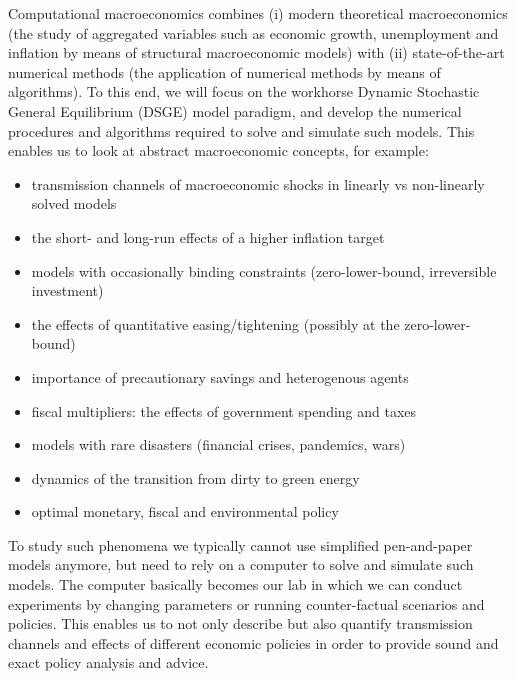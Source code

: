 Computational macroeconomics combines (i) modern theoretical macroeconomics
  (the study of aggregated variables such as economic growth, unemployment and inflation
  by means of structural macroeconomic models)
  with (ii) state-of-the-art numerical methods (the application of numerical methods by means of algorithms).
To this end, we will focus on the workhorse Dynamic Stochastic General Equilibrium (DSGE) model paradigm,
  and develop the numerical procedures and algorithms required to solve and simulate such models.
This enables us to look at abstract macroeconomic concepts, for example:
\begin{itemize}
	\item transmission channels of macroeconomic shocks in linearly vs non-linearly solved models
	\item the short- and long-run effects of a higher inflation target
	\item models with occasionally binding constraints (zero-lower-bound, irreversible investment)
	\item the effects of quantitative easing/tightening (possibly at the zero-lower-bound)
	\item importance of precautionary savings and heterogenous agents
	\item fiscal multipliers: the effects of government spending and taxes
	\item models with rare disasters (financial crises, pandemics, wars)
	\item dynamics of the transition from dirty to green energy
	\item optimal monetary, fiscal and environmental policy
\end{itemize}

To study such phenomena we typically cannot use simplified pen-and-paper models anymore,
  but need to rely on a computer to solve and simulate such models.
The computer basically becomes our lab in which we can conduct experiments
  by changing parameters or running counter-factual scenarios and policies.
This enables us to not only describe but also quantify transmission channels and effects of different economic policies
  in order to provide sound and exact policy analysis and advice.


